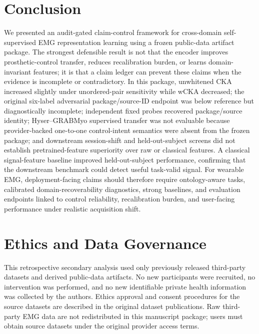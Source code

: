\documentclass[journal]{IEEEtran}
\begin{document}
\section{Conclusion}
We presented an audit-gated claim-control framework for cross-domain self-supervised EMG representation learning using a frozen public-data artifact package. The strongest defensible result is not that the encoder improves prosthetic-control transfer, reduces recalibration burden, or learns domain-invariant features; it is that a claim ledger can prevent these claims when the evidence is incomplete or contradictory. In this package, unwhitened CKA increased slightly under unordered-pair sensitivity while wCKA decreased; the original six-label adversarial package/source-ID endpoint was below reference but diagnostically incomplete; independent fixed probes recovered package/source identity; Hyser--GRABMyo supervised transfer was not evaluable because provider-backed one-to-one control-intent semantics were absent from the frozen package; and downstream session-shift and held-out-subject screens did not establish pretrained-feature superiority over raw or classical features. A classical signal-feature baseline improved held-out-subject performance, confirming that the downstream benchmark could detect useful task-valid signal. For wearable EMG, deployment-facing claims should therefore require ontology-aware tasks, calibrated domain-recoverability diagnostics, strong baselines, and evaluation endpoints linked to control reliability, recalibration burden, and user-facing performance under realistic acquisition shift.
\section*{Ethics and Data Governance}
This retrospective secondary analysis used only previously released third-party datasets and derived public-data artifacts. No new participants were recruited, no intervention was performed, and no new identifiable private health information was collected by the authors. Ethics approval and consent procedures for the source datasets are described in the original dataset publications. Raw third-party EMG data are not redistributed in this manuscript package; users must obtain source datasets under the original provider access terms.
\end{document}
